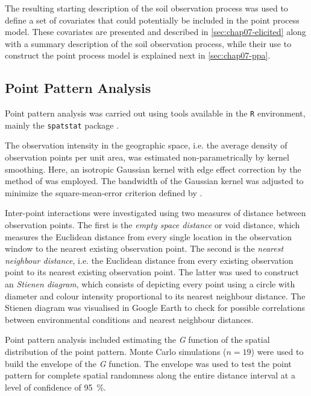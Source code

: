 The resulting starting description of the soil observation process was used to define a set of covariates that 
could potentially be included in the point process model. These covariates are presented and described in 
\autoref{sec:chap07-elicited} along with a summary description of the soil observation process, while their 
use to construct the point process model is explained next in \autoref{sec:chap07-ppa}. 

\subsection{Point Pattern Analysis}
\label{sec:chap07-ppa}

Point pattern analysis was carried out using tools available in the \texttt{R} environment, mainly the 
\texttt{spatstat} package \cite{Baddeley2010}.

The observation intensity in the geographic space, i.e. the average density of observation points per unit 
area, was estimated non-parametrically by kernel smoothing. Here, an isotropic Gaussian kernel with edge 
effect correction by the method of \citet{Diggle1985} was employed. The bandwidth of the Gaussian kernel 
was adjusted to minimize the square-mean-error criterion defined by \citet{Diggle1985}.

Inter-point interactions were investigated using two measures of distance between observation points. The 
first is the \emph{empty space distance} or void distance, which measures the Euclidean distance from every 
single location in the observation window to the nearest existing observation point. The second is the 
\emph{nearest neighbour distance}, i.e. the Euclidean distance from every existing observation point to its 
nearest existing observation point. The latter was used to construct an \emph{Stienen diagram}, which consists 
of  depicting every point using a circle with diameter and colour intensity proportional to its nearest 
neighbour distance. The Stienen diagram was visualised in Google Earth\rr{} to check for possible correlations 
between environmental conditions and nearest neighbour distances.




Point pattern analysis included estimating the \emph{G} function of the spatial distribution of the point 
pattern. Monte Carlo simulations ($n = 19$) were used to build the envelope of the \emph{G} function. The 
envelope was used to test the point pattern for complete spatial randomness along the entire distance interval 
at a level of confidence of \SI{95}{\percent}.

